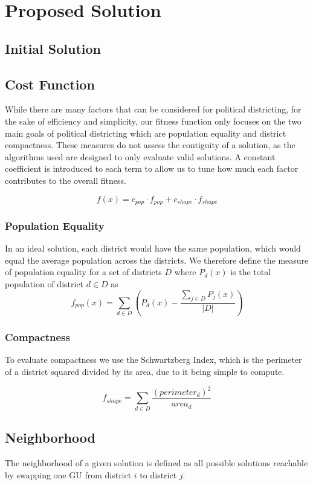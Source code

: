 \documentclass[journal]{IEEEtran}
\begin{document}
\section{Proposed Solution}
\subsection{Initial Solution}
\subsection{Cost Function}
While there are many factors that can be considered for political districting, for the sake of efficiency and simplicity, our fitness function only focuses on the two main goals of political districting which are population equality and district compactness.  These measures do not assess the contiguity of a solution, as the algorithms used are designed to only evaluate valid solutions.  A constant coefficient is introduced to each term to allow us to tune how much each factor contributes to the overall fitness.

$$f(x) = c_{pop} \cdot f_{pop} + c_{shape} \cdot f_{shape}$$

\subsubsection{Population Equality}
In an ideal solution, each district would have the same population, which would equal the average population across the districts.  We therefore define the measure of population equality for a set of districts $D$ where $P_d(x)$ is the total population of district $d \in D$ as
$$f_{pop}(x) = \sum_{d \in D} \left(P_d(x) - \frac{\sum_{j \in D} P_j(x)}{|D|}\right)$$

\subsubsection{Compactness}
To evaluate compactness we use the Schwartzberg Index, which is the perimeter of a district squared divided by its area, due to it being simple to compute.

$$f_{shape} = \sum_{d \in D} \frac{(perimeter_d)^2}{area_d}$$

\subsection{Neighborhood}
The neighborhood of a given solution is defined as all possible solutions reachable by swapping one GU from district $i$ to district $j$.  
\end{document}
